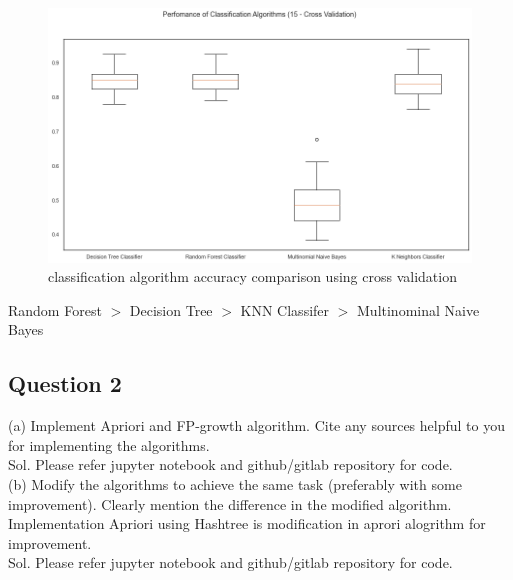 \documentclass[12pt, letter]{article}
\begin{document}
\begin{figure}[h]
    \centering
    \includegraphics[scale = 0.5]{Class_perf.png}
    \caption{classification algorithm accuracy comparison using cross validation}
    \label{class_perf}
\end{figure}

\noindent
Random Forest $>$ Decision Tree $>$ KNN Classifer $>$ Multinominal Naive Bayes 


\subsection*{Question 2}

\noindent
(a) Implement Apriori and FP-growth algorithm. Cite any sources helpful to you for implementing the algorithms. \\ 

Sol. Please refer jupyter notebook and github/gitlab repository for code. \\

\noindent
(b) Modify the algorithms to achieve the same task (preferably with some improvement). Clearly mention the difference in the modified algorithm. \\

Implementation Apriori using Hashtree is modification in aprori alogrithm for improvement. \\

Sol. Please refer jupyter notebook and github/gitlab repository for code.

\end{document}
